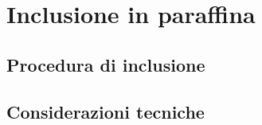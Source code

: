 \chapter{Inclusione in paraffina}

\section{Procedura di inclusione}

\section{Considerazioni tecniche}
